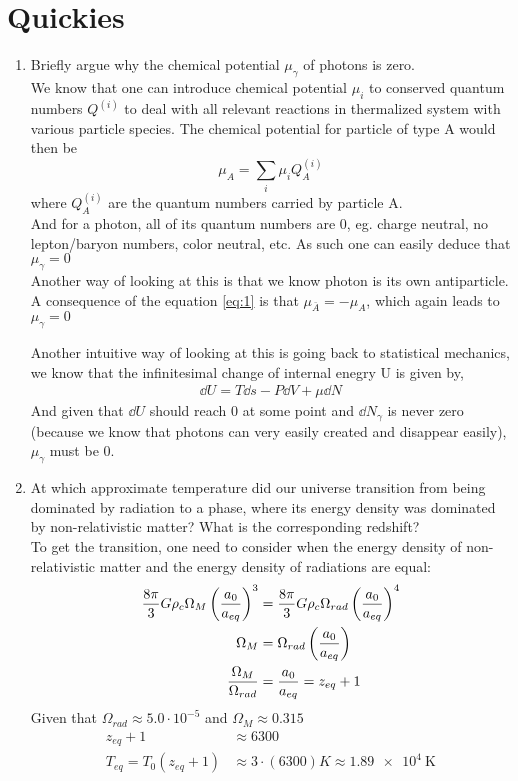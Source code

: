 \section{Quickies}
\begin{enumerate}[label=(\alph*)]
\item Briefly argue why the chemical potential $\mu_{\gamma}$ of photons is zero.\\
We know that one can introduce chemical potential $\mu_i$ to conserved quantum numbers $Q^{(i)}$ to deal with all relevant reactions in thermalized system with various
particle species. The chemical potential for particle of type A would then be
\begin{equation} \label{eq:1}
\mu_A = \sum_i \mu_i Q^{(i)}_A
\end{equation}
where $Q^{(i)}_A$ are the quantum numbers carried by particle A.\\

And for a photon, all of its quantum numbers are 0, eg. charge neutral, no lepton/baryon numbers, color neutral, etc. As such one can easily deduce that $\mu_{\gamma} = 0$\\

Another way of looking at this is that we know photon is its own antiparticle. A consequence of the equation \ref{eq:1} is that $\mu_{\bar{A}} = -\mu_A $, which again leads to $\mu_{\gamma}=0$ 

Another intuitive way of looking at this is going back to statistical mechanics, we know that the infinitesimal change of internal enegry U  is given by,
\begin{align}
\dd{U} = T\dd{s} - P \dd{V} + \mu \dd{N}
\end{align}
And given that $\dd{U}$ should reach 0 at some point and $\dd{N_{\gamma}}$ is never zero (because we know that photons can very easily created and disappear easily), $\mu_{\gamma}$ must be 0.
\item At which approximate temperature did our universe transition from being dominated by radiation to a phase, where its energy density was dominated by non-relativistic matter? What is the corresponding redshift?\\
To get the transition, one need to consider when the energy density of non-relativistic matter and the energy density of radiations are equal:
\begin{align}
\frac{8\pi}{3}G\rho_c \Omega_M \left( \frac{a_0}{a_{eq}} \right)^3 &= \frac{8\pi}{3}G\rho_c \Omega_{rad} \left( \frac{a_0}{a_{eq}} \right)^4 \\
\Omega_M &= \Omega_{rad} \left( \frac{a_0}{a_{eq}} \right) \notag \\
\frac{\Omega_M }{\Omega_{rad}} &= \frac{a_0}{a_{eq}} = z_{eq} +1 
\end{align}
Given that $\Omega_{rad} \approx 5.0\cdot 10^{-5}$ and $\Omega_M \approx 0.315$ 
\begin{align}
z_{eq} +1 &\approx 6300\\ 
T_{eq} =T_0(z_{eq} +1 ) &\approx 3\cdot(6300) K \approx \SI{1.89e4}{\kelvin}
\end{align}

\end{enumerate}
